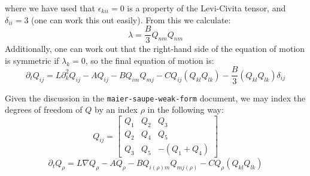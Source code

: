 \documentclass[reqno]{article}
\begin{document}
    where we have used that $\epsilon_{kii} = 0$ is a property of the Levi-Civita tensor, and $\delta_{ii} = 3$ (one can work this out easily).
    From this we calculate:
    \begin{equation}
        \lambda = \frac{B}{3} Q_{nm} Q_{nm}
    \end{equation}
    Additionally, one can work out that the right-hand side of the equation of motion is symmetric if $\lambda_k = 0$, so the final equation of motion is:
    \begin{equation}
        \partial_t Q_{ij}
        =
        L \partial_k^2 Q_{ij}
		- A Q_{ij}
		- B Q_{im} Q_{mj}
		- C Q_{ij} (Q_{kl} Q_{lk})
        - \frac{B}{3} (Q_{kl} Q_{lk}) \delta_{ij}
    \end{equation}

	Given the discussion in the \verb|maier-saupe-weak-form| document, we may index the degrees of freedom of $Q$ by an index $\rho$ in the following way:
	\begin{equation}
		Q_{ij}
		=
		\begin{bmatrix}
		Q_1 & Q_2 & Q_3 \\
		Q_2 & Q_4 & Q_5 \\
		Q_3 & Q_5 & -(Q_1 + Q_4)
		\end{bmatrix}
	\end{equation}
	\begin{equation}
		\partial_t Q_\rho
		= L \nabla Q_\rho
		- A Q_\rho
		- B Q_{i(\rho) m} Q_{m j(\rho)}
		- C Q_\rho (Q_{kl} Q_{lk})
	\end{equation}
	
\end{document}

